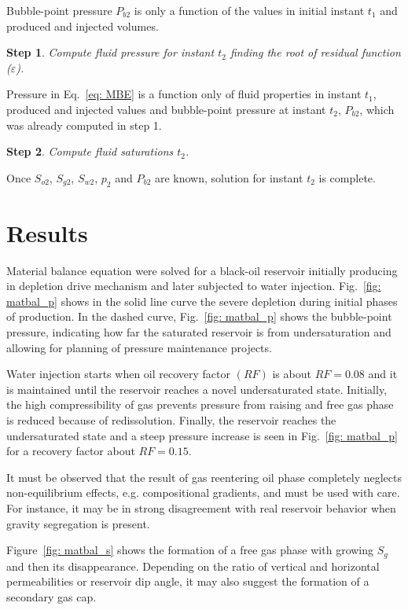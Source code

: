 \documentclass[final,authoryear,5p,times,twocolumn,10pt]{elsarticle}
\newtheorem{step}{Step}
\begin{document}
Bubble-point pressure $P_{b2}$ is only a function of the values in initial instant $t_1$ and produced and injected volumes.

\begin{step}
Compute fluid pressure for instant $t_2$ finding the root of residual function ($\varepsilon$).
\end{step}

Pressure in Eq.~\eqref{eq: MBE} is a function only of fluid properties in instant $t_1$, produced and injected values and bubble-point pressure at instant $t_2$, $P_{b2}$, which was already computed in step 1.

\begin{step}
Compute fluid saturations $t_2$.
\end{step}

Once $S_{o2}$, $S_{g2}$, $S_{w2}$, $p_2$ and $P_{b2}$ are known, solution for instant $t_2$ is complete.

\section{Results}
Material balance equation were solved for a black-oil reservoir initially producing in depletion drive mechanism and later subjected to water injection. Fig.~\ref{fig: matbal_p} shows in the solid line curve the severe depletion during initial phases of production. In the dashed curve, Fig.~\ref{fig: matbal_p} shows the bubble-point pressure, indicating how far the saturated reservoir is from undersaturation and allowing for planning of pressure maintenance projects.


Water injection starts when oil recovery factor $(RF)$ is about $RF=0.08$ and it is maintained until the reservoir reaches a novel undersaturated state. Initially, the high compressibility of gas prevents pressure from raising and free gas phase is reduced because of redissolution. Finally, the reservoir reaches the undersaturated state and a steep pressure increase is seen in Fig.~\ref{fig: matbal_p} for a recovery factor about $RF=0.15$.

It must be observed that the result of gas reentering oil phase completely neglects non-equilibrium effects, e.g. compositional gradients, and must be used with care. For instance, it may be in strong disagreement with real reservoir behavior when gravity segregation is present.

Figure~\ref{fig: matbal_s} shows the formation of a free gas phase with growing $S_g$ and then its disappearance. Depending on the ratio of vertical and horizontal permeabilities or reservoir dip angle, it may also suggest the formation of a secondary gas cap.
\end{document}
